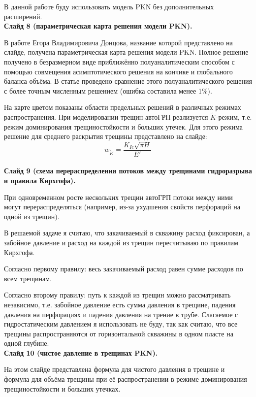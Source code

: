 \documentclass[a4paper, 12pt]{article}
\begin{document}
В данной работе буду использовать модель PKN без дополнительных расширений.
\\


\textbf{Слайд 8 (параметрическая карта решения модели PKN).}

В работе Егора Владимировича Донцова, название которой представлено на слайде, получена параметрическая карта решения модели PKN.
Полное решение получено в безразмерном виде приближённо полуаналитическим способом с помощью совмещения асимптотического решения на кончике и глобального баланса объёма.
В статье проведено сравнение этого полуаналитического решения с более точным численным решением (ошибка составила менее 1\%).

На карте цветом показаны области предельных решений в различных режимах распространения.
При моделировании трещин автоГРП реализуется $\tilde{K}$-режим, т.е. режим доминирования трещиностойкости и больших утечек.
Для этого режима решение для среднего раскрытия трещины представлено на слайде:
$$
\bar{w}_{\tilde{K}}=\frac{K_{Ic}\sqrt{\pi H}}{E'}
$$\\


\textbf{Слайд 9 (схема перераспределения потоков между трещинами гидроразрыва и правила Кирхгофа).}

При одновременном росте нескольких трещин автоГРП потоки между ними могут перераспределяться (например, из-за ухудшения свойств перфораций на одной из трещин).

В решаемой задаче я считаю, что закачиваемый в скважину расход фиксирован, а забойное давление и расход на каждой из трещин пересчитываю по правилам Кирхгофа.

Согласно первому правилу: весь закачиваемый расход равен сумме расходов по всем трещинам.

Согласно второму правилу: путь к каждой из трещин можно рассматривать независимо, т.е. забойное давление есть сумма давления в трещине, падения давления на перфорациях и падения давления на трение в трубе.
Слагаемое с гидростатическим давлением я использовать не буду, так как считаю, что все трещины распространяются от горизонтальной скважины в одном пласте на одной глубине.\\

\textbf{Слайд 10 (чистое давление в трещинах PKN).}

На этом слайде представлена формула для чистого давления в трещине и формула для объёма трещины при её распространении в режиме доминирования трещиностойкости и больших утечках.
\end{document}
